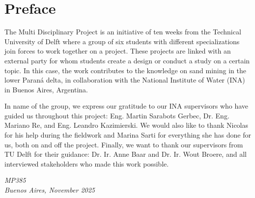 \chapter*{Preface}

The Multi Disciplinary Project is an initiative of ten weeks from the Technical University of Delft where a group of six students with different specializations join forces to work together on a project. These projects are linked with an external party for whom students create a design or conduct a study on a certain topic. In this case, the work contributes to the knowledge on sand mining in the lower Paraná delta, in collaboration with the National Institute of Water (INA) in Buenos Aires, Argentina. 

In name of the group, we express our gratitude to our INA supervisors who have guided us throughout this project: Eng. Martin Sarabots Gerbec, Dr. Eng. Mariano Re, and Eng. Leandro Kazimierski. We would also like to thank Nicolas for his help during the fieldwork and Marina Sarti for everything she has done for us, both on and off the project. Finally, we want to thank our supervisors from TU Delft for their guidance: Dr. Ir. Anne Baar and Dr. Ir. Wout Broere, and all interviewed stakeholders who made this work possible.

\begin{flushright}
{\makeatletter\itshape
    MP385 \\
    Buenos Aires, November 2025
\makeatother}
\end{flushright}